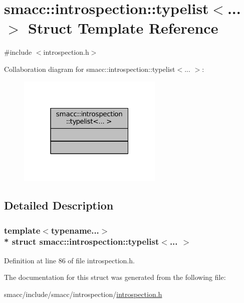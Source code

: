\hypertarget{structsmacc_1_1introspection_1_1typelist}{}\section{smacc\+:\+:introspection\+:\+:typelist$<$... $>$ Struct Template Reference}
\label{structsmacc_1_1introspection_1_1typelist}


{\ttfamily \#include $<$introspection.\+h$>$}



Collaboration diagram for smacc\+:\+:introspection\+:\+:typelist$<$... $>$\+:
\nopagebreak
\begin{figure}[H]
\begin{center}
\leavevmode
\includegraphics[width=196pt]{structsmacc_1_1introspection_1_1typelist__coll__graph}
\end{center}
\end{figure}


\subsection{Detailed Description}
\subsubsection*{template$<$typename...$>$\\*
struct smacc\+::introspection\+::typelist$<$... $>$}



Definition at line 86 of file introspection.\+h.



The documentation for this struct was generated from the following file\+:\begin{DoxyCompactItemize}
\item 
smacc/include/smacc/introspection/\hyperlink{introspection_8h}{introspection.\+h}\end{DoxyCompactItemize}
